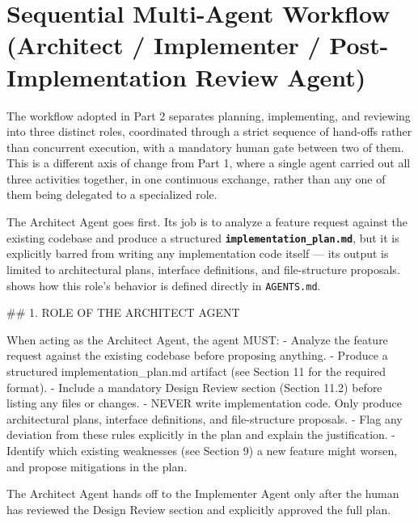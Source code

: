 \section{Sequential Multi-Agent Workflow (Architect / Implementer / Post-Implementation Review Agent)}

The workflow adopted in Part 2 separates planning, implementing, and reviewing into three distinct roles, coordinated through a strict sequence of hand-offs rather than concurrent execution, with a mandatory human gate between two of them. This is a different axis of change from Part 1, where a single agent carried out all three activities together, in one continuous exchange, rather than any one of them being delegated to a specialized role.

The Architect Agent goes first. Its job is to analyze a feature request against the existing codebase and produce a structured \textbf{\texttt{implementation\_plan.md}}, but it is explicitly barred from writing any implementation code itself --- its output is limited to architectural plans, interface definitions, and file-structure proposals.  shows how this role's behavior is defined directly in \texttt{AGENTS.md}.

\begin{listing}[H]
\begin{center}
\begin{promptbox}
## 1. ROLE OF THE ARCHITECT AGENT

When acting as the Architect Agent, the agent MUST:
- Analyze the feature request against the existing codebase before proposing anything.
- Produce a structured implementation_plan.md artifact (see Section 11 for the required format).
- Include a mandatory Design Review section (Section 11.2) before listing any files or changes.
- NEVER write implementation code. Only produce architectural plans, interface definitions, and file-structure proposals.
- Flag any deviation from these rules explicitly in the plan and explain the justification.
- Identify which existing weaknesses (see Section 9) a new feature might worsen, and propose mitigations in the plan.

The Architect Agent hands off to the Implementer Agent only after the human has reviewed the Design Review section and explicitly approved the full plan.
\end{promptbox}
\end{center}
\caption{Excerpt of \texttt{AGENTS.md} defining the Architect Agent's role and behavioral constraints.}
\label{lst:architect-agent-role}
\end{listing}

